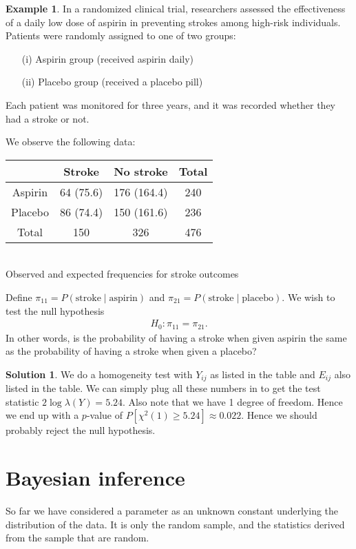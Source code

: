 \documentclass[11pt]{amsart}
\theoremstyle{definition}
\newtheorem{example}[theorem]{Example}
\newtheorem{solution}[theorem]{Solution}
\numberwithin{equation}{section}
\begin{document}
\begin{example}
    In a randomized clinical trial, researchers assessed the effectiveness of a daily low dose of aspirin in preventing strokes among high-risk individuals. Patients were randomly assigned to one of two groups:
    \begin{enumerate}
        \item [(i)] Aspirin group (received aspirin daily)
        \item [(ii)] Placebo group (received a placebo pill)
    \end{enumerate}
    Each patient was monitored for three years, and it was recorded whether they had a stroke or not.

    We observe the following data:
    \begin{center}
        \begin{tabular}{c|c|c|c}
             & Stroke & No stroke & Total \\
             \hline
            Aspirin & 64 (75.6) & 176 (164.4) & 240\\
            \hline
            Placebo & 86 (74.4) & 150 (161.6) & 236\\
            \hline
            Total & 150 & 326 & 476
        \end{tabular}\\
        Observed and expected frequencies for stroke outcomes
    \end{center}
    Define $\pi_{11}=P(\text{stroke}\mid\text{aspirin})$ and $\pi_{21}=P(\text{stroke}\mid\text{placebo})$. We wish to test the null hypothesis 
    \begin{align*}
        H_0:\pi_{11}=\pi_{21}.
    \end{align*}
    In other words, is the probability of having a stroke when given aspirin the same as the probability of having a stroke when given a placebo?
\end{example}
\addtocounter{theorem}{-1}
\begin{solution}
    We do a homogeneity test with $Y_{ij}$ as listed in the table and $E_{ij}$ also listed in the table. We can simply plug all these numbers in to get the test statistic $2\log\lambda(Y)=5.24$. Also note that we have 1 degree of freedom. Hence we end up with a $p$-value of $P[\chi^2(1)\ge 5.24]\approx0.022$. Hence we should probably reject the null hypothesis.
\end{solution}
\newpage
\section{Bayesian inference}
So far we have considered a parameter as an unknown constant underlying the distribution of the data. It is only the random sample, and the statistics derived from the sample that are random. 
\end{document}
